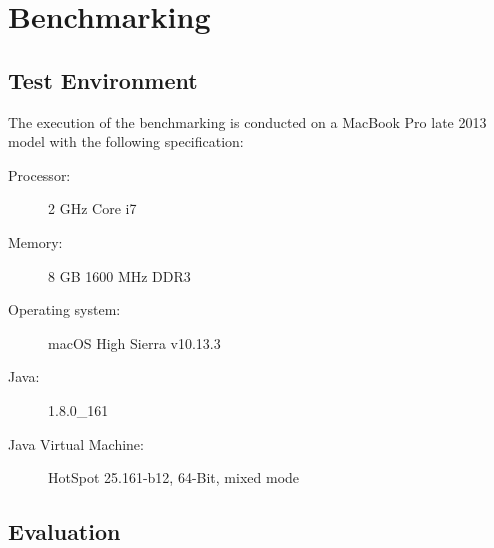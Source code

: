 \chapter{Benchmarking}


\section{Test Environment}
The execution of the benchmarking is conducted on a MacBook Pro late 2013 model with the following specification:

\begin{description}
	\item [Processor:] 2 GHz Core i7
	\item [Memory:] 8 GB 1600 MHz DDR3
	\item [Operating system:] macOS High Sierra v10.13.3
	\item [Java:] 1.8.0\_161
	\item [Java Virtual Machine:] HotSpot 25.161-b12, 64-Bit, mixed mode
\end{description}


\section{Evaluation}